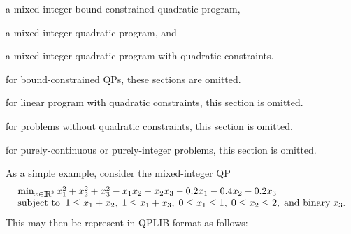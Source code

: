 \begin{description}
\begin{description}
\begin{description}[leftmargin=!,labelwidth=\widthof{\texttt{SMILQPC}}]
\item [MIBQP]   a mixed-integer bound-constrained quadratic program,
\item [MIQP]    a mixed-integer quadratic program, and
\item [MIQPQC]  a mixed-integer quadratic program with quadratic constraints.
\end{description}
\end{description}


\item [{[2]}]
for bound-constrained QPs, these sections are omitted.
\item [{[3]}]
for linear program with quadratic constraints, this section is omitted.
\item [{[4]}]
for problems without quadratic constraints, this section is omitted.
\item [{[5]}]
for purely-continuous or purely-integer problems, this section is omitted.
\end{description}

As a simple example, consider the mixed-integer QP
\[\arr{l}{\min_{x \in \smallRe^3} x_1^2 + x_2^2 + x_3^2 - x_1 x_2 - x_2 x_3
  - 0.2 x_1  -0.4 x_2 - 0.2 x_3 \\
\st 1 \leq x_1 + x_2, \; 1 \leq x_1 + x_3, \; 0 \leq x_1 \leq 1,
\; 0 \leq x_2 \leq 2, \; \mbox{and binary} \; x_3.}
\]
This may then be represent in QPLIB format as follows:

